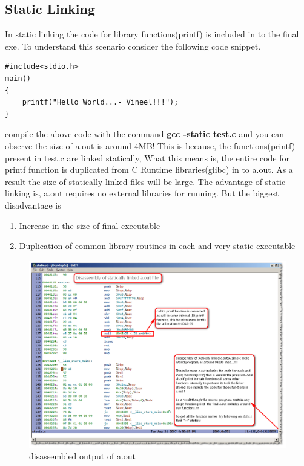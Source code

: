 \documentclass{article}
\begin{document}
\subsection{Static Linking}
In static linking the code for library functions(printf) is included in to the final exe. To understand this scenario consider the following code snippet.
\begin{verbatim}
#include<stdio.h>
main()
{
    printf("Hello World...- Vineel!!!");
}
\end{verbatim}
compile the above code with the command {\textbf{gcc -static test.c}} and you can observe the size of a.out is around 4MB! This is because, the functions(printf) present in test.c are linked statically, What this means is, the entire code for printf function is duplicated from C Runtime libraries(glibc) in to a.out. As a result the size of statically linked files will be large. The advantage of static linking is, a.out requires no external libraries for running. But the biggest disadvantage is

\begin{enumerate}[noitemsep]
\item Increase in the size of final executable
\item Duplication of common library routines in each and very static executable
\end{enumerate}

\begin{figure}[H]
\centering
\includegraphics[width=\textwidth]{Linking3.png}
\caption{disassembled output of a.out}
\end{figure}
\end{document}
